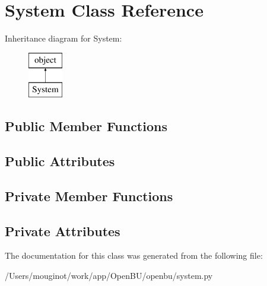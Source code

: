 \hypertarget{classopenbu_1_1system_1_1_system}{}\section{System Class Reference}
\label{classopenbu_1_1system_1_1_system}
Inheritance diagram for System\+:\begin{figure}[H]
\begin{center}
\leavevmode
\includegraphics[height=2.000000cm]{classopenbu_1_1system_1_1_system}
\end{center}
\end{figure}
\subsection*{Public Member Functions}
\subsection*{Public Attributes}
\subsection*{Private Member Functions}
\subsection*{Private Attributes}


The documentation for this class was generated from the following file\+:\begin{DoxyCompactItemize}
\item 
/\+Users/mouginot/work/app/\+Open\+B\+U/openbu/system.\+py\end{DoxyCompactItemize}
